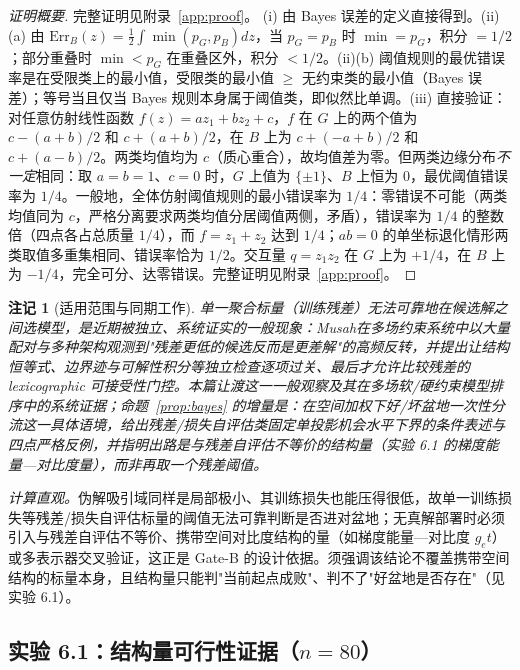 \documentclass[fontset=windows,11pt]{ctexart}
\newtheorem*{remark}{注记}
\numberwithin{equation}{section}
\begin{document}
\begin{proof}[证明概要]完整证明见附录~\ref{app:proof}。
(i) 由 Bayes 误差的定义直接得到。(ii)(a) 由 $\mathrm{Err}_B(z)=\tfrac12\int\min(p_G,p_B)dz$，当 $p_G=p_B$ 时 $\min=p_G$，积分 $=1/2$；部分重叠时 $\min<p_G$ 在重叠区外，积分 $<1/2$。(ii)(b) 阈值规则的最优错误率是在受限类上的最小值，受限类的最小值 $\ge$ 无约束类的最小值（Bayes 误差）；等号当且仅当 Bayes 规则本身属于阈值类，即似然比单调。(iii) 直接验证：对任意仿射线性函数 $f(z)=az_1+bz_2+c$，$f$ 在 $G$ 上的两个值为 $c-(a+b)/2$ 和 $c+(a+b)/2$，在 $B$ 上为 $c+(-a+b)/2$ 和 $c+(a-b)/2$。两类均值均为 $c$（质心重合），故均值差为零。但两类边缘分布\emph{不一定}相同：取 $a=b=1$、$c=0$ 时，$G$ 上值为 $\{\pm1\}$、$B$ 上恒为 $0$，最优阈值错误率为 $1/4$。一般地，全体仿射阈值规则的最小错误率为 $1/4$：零错误不可能（两类均值同为 $c$，严格分离要求两类均值分居阈值两侧，矛盾），错误率为 $1/4$ 的整数倍（四点各占总质量 $1/4$），而 $f=z_1+z_2$ 达到 $1/4$；$ab=0$ 的单坐标退化情形两类取值多重集相同、错误率恰为 $1/2$。交互量 $q=z_1z_2$ 在 $G$ 上为 $+1/4$，在 $B$ 上为 $-1/4$，完全可分、达零错误。完整证明见附录~\ref{app:proof}。
\end{proof}

\begin{remark}[适用范围与同期工作]\label{rem:musah}
单一聚合标量（训练残差）无法可靠地在候选解之间选模型，是近期被独立、系统证实的一般现象：Musah\cite{Musah2026}在多场约束系统中以大量配对与多种架构观测到"残差更低的候选反而是更差解"的高频反转，并提出让结构恒等式、边界迹与可解性积分等独立检查逐项过关、最后才允许比较残差的 lexicographic 可接受性门控。本篇\emph{让渡}这一一般观察及其在多场软/硬约束模型排序中的系统证据；命题~\ref{prop:bayes} 的增量是：在\emph{空间加权下好/坏盆地一次性分流}这一具体语境，给出残差/损失自评估类固定单投影机会水平下界的条件表述与四点严格反例，并指明出路是与残差自评估不等价的结构量（实验 6.1 的梯度能量—对比度量），而非再取一个残差阈值。
\end{remark}

\noindent\emph{计算直观。}伪解吸引域同样是局部极小、其训练损失也能压得很低，故单一训练损失等残差/损失自评估标量的阈值无法可靠判断是否进对盆地；无真解部署时必须引入与残差自评估不等价、携带空间对比度结构的量（如梯度能量—对比度 $g_et$）或多表示器交叉验证，这正是 Gate-B 的设计依据。须强调该结论不覆盖携带空间结构的标量本身，且结构量只能判"当前起点成败"、判不了"好盆地是否存在"（见实验 6.1）。

\subsection{实验 6.1：结构量可行性证据（$n=80$）}\label{sec:g2}
\end{document}
